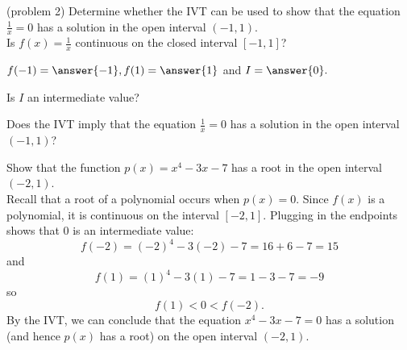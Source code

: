 \documentclass[handout]{ximera}
\begin{document}
\begin{problem}(problem 2)
Determine whether the IVT can be used to show that the equation $\frac{1}{x} = 0$ has a solution in the open interval $(-1, 1).$\\
Is $f(x) = \frac{1}{x}$ continuous on the closed interval $[-1,1]$? 
\begin{center}
\begin{multipleChoice}
\end{multipleChoice}
\end{center}

$f(-1) = \answer{-1}, f(1) = \answer{1}$ and $I = \answer{0}.$

Is $I$ an intermediate value? 
\begin{multipleChoice}
\end{multipleChoice}

Does the IVT imply that the equation $\frac{1}{x} = 0$ has a solution in the open interval $(-1, 1)$?
\begin{multipleChoice}
\end{multipleChoice}
\end{problem}




\begin{example}[example 3]
Show that the function $p(x) = x^4 - 3x - 7$ has a root in the open interval $(-2, 1)$.\\

Recall that a root of a polynomial occurs when $p(x) = 0$. Since $f(x)$ is a polynomial, it is continuous on the interval 
$[-2, 1]$. Plugging in the endpoints shows that 0 is an intermediate value:
\[f(-2) = (-2)^4 - 3(-2) - 7 = 16 + 6 - 7 = 15 \]
and
\[f(1) = (1)^4 - 3(1) - 7 = 1 -3 - 7 = -9 \]
so 
\[f(1) < 0 < f(-2).\]
By the IVT, we can conclude that the equation $x^4 - 3x - 7 = 0$ has a solution (and hence $p(x)$ has a root) 
on the open interval $(-2, 1)$.
\end{example}
\end{document}
